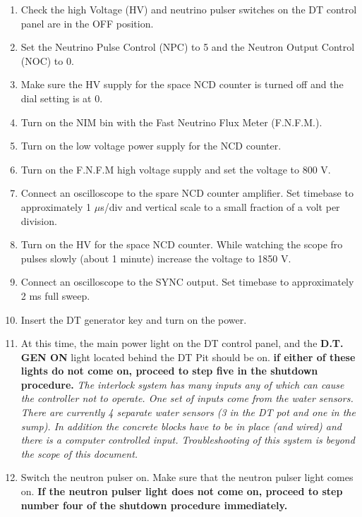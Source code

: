 \documentclass[10pt]{article}
\begin{document}
\begin{enumerate}
\item \CheckBox[name=dttop8]{} Check the high Voltage (HV) and neutrino pulser switches on the DT control panel are in the OFF position.
\item \CheckBox[name=dttop9]{} Set the Neutrino Pulse Control (NPC) to 5 and the Neutron Output Control (NOC) to 0.
\item \CheckBox[name=dttop10]{} Make sure the HV supply for the space NCD counter is turned off and the dial setting is at 0.
\item \CheckBox[name=dttop11]{} Turn on the NIM bin with the Fast Neutrino Flux Meter (F.N.F.M.).
\item \CheckBox[name=dttop12]{} Turn on the low voltage power supply for the NCD counter.
\item \CheckBox[name=dttop13]{} Turn on the F.N.F.M high voltage supply and set the voltage to 800 V.
\item \CheckBox[name=dttop14]{} Connect an oscilloscope to the spare NCD counter amplifier. Set timebase to approximately 1 $\mu$s/div and vertical scale to a small fraction of a volt per division.
\item \CheckBox[name=dttop15]{} Turn on the HV for the space NCD counter. While watching the scope fro pulses slowly (about 1 minute) increase the voltage to 1850 V.
\item \CheckBox[name=dttop16]{} Connect an oscilloscope to the SYNC output. Set timebase to approximately 2 ms full sweep.
\item \CheckBox[name=dttop17]{} Insert the DT generator key and turn on the power.
\item \CheckBox[name=dttop18]{} At this time, the main power light on the DT control panel, and the {\bf D.T. GEN ON} light located behind the DT Pit should be on. {\bf if either of these lights do not come on, proceed to step five in the shutdown procedure.} {\it The interlock system has many inputs any of which can cause the controller not to operate. One set of inputs come from the water sensors. There are currently 4 separate water sensors (3 in the DT pot and one in the sump). In addition the concrete blocks have to be in place (and wired) and there is a computer controlled input. Troubleshooting of this system is beyond the scope of this document.}
\item \CheckBox[name=dttop19]{} Switch the neutron pulser on. Make sure that the neutron pulser light comes on. {\bf If the neutron pulser light does not come on, proceed to step number four of the shutdown procedure immediately.}

\end{enumerate}
\end{document}
